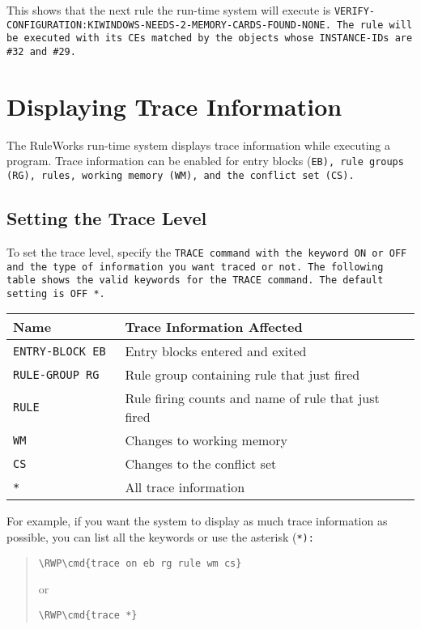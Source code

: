 This shows that the next rule the run-time system will execute is
\tt{VERIFY-CONFIGURATION:KIWINDOWS-NEEDS-2-MEMORY-CARDS-FOUND-NONE}.
The rule will be executed with its CEs matched by the objects whose
\tt{INSTANCE-ID}s are \verb|#32| and \verb|#29|.

\section{Displaying Trace Information}

The RuleWorks run-time system displays trace information while
executing a program. Trace information can be enabled for entry blocks
(\tt{EB}), rule groups (\tt{RG}), rules, working memory (\tt{WM}), and
the conflict set (\tt{CS}).

\subsection{Setting the Trace Level}

To set the trace level, specify the \tt{TRACE} command with the
keyword \tt{ON} or \tt{OFF} and the type of information you want
traced or not. The following table shows the valid keywords for the
\tt{TRACE} command. The default setting is \tt{OFF *}.

\begin{center}
\begin{tabular}{ll}
  \toprule
  Name & Trace Information Affected \\
  \midrule
  \tt{ENTRY-BLOCK} \tt{EB} & Entry blocks entered and exited \\
  \tt{RULE-GROUP} \tt{RG} & Rule group containing rule that just fired \\
  \tt{RULE} & Rule firing counts and name of rule that just fired \\
  \tt{WM} & Changes to working memory \\
  \tt{CS} & Changes to the conflict set \\
  \tt{*} &  All trace information \\
  \bottomrule
\end{tabular}
\end{center}

For example, if you want the system to display as much trace
information as possible, you can list all the keywords or use the
asterisk (\tt{*}):

\begin{quote}
\begin{Verbatim}[commandchars=\\\{\}]
\RWP\cmd{trace on eb rg rule wm cs}
\end{Verbatim}
or
\begin{Verbatim}[commandchars=\\\{\}]
\RWP\cmd{trace *}
\end{Verbatim}
\end{quote}

